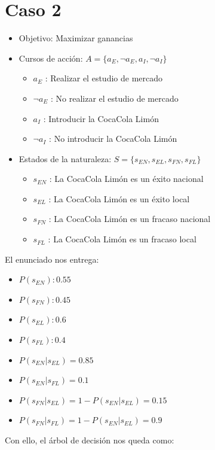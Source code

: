 \documentclass[11pt,letterpaper]{article}
\begin{document}
\section{Caso 2}
\begin{itemize}
    \item Objetivo: Maximizar ganancias
    \item Cursos de acción: $A=\{a_E, \neg a_E, a_I, \neg a_I\}$
        \begin{itemize}
            \item $a_E$ : Realizar el estudio de mercado
            \item $\neg a_E$ : No realizar el estudio de mercado
            \item $a_I$ : Introducir la CocaCola Limón
            \item $\neg a_I$ : No introducir la CocaCola Limón
        \end{itemize}
    \item Estados de la naturaleza: $S=\{s_{EN}, s_{EL}, s_{FN}, s_{FL}\}$
        \begin{itemize}
            \item $s_{EN}$ : La CocaCola Limón es un éxito nacional
            \item $s_{EL}$ : La CocaCola Limón es un éxito local
            \item $s_{FN}$ : La CocaCola Limón es un fracaso nacional
            \item $s_{FL}$ : La CocaCola Limón es un fracaso local
        \end{itemize}
\end{itemize}

El enunciado nos entrega:
\begin{itemize}
    \item $P(s_{EN}): 0.55$
    \item $P(s_{FN}): 0.45$
    \item $P(s_{EL}): 0.6$
    \item $P(s_{FL}): 0.4$
    \item $P(s_{EN}|s_{EL}) = 0.85$
    \item $P(s_{EN}|s_{FL}) = 0.1$
    \item $P(s_{FN}|s_{EL}) = 1 - P(s_{EN}|s_{EL}) = 0.15$
    \item $P(s_{FN}|s_{FL}) = 1 - P(s_{EN}|s_{EL}) = 0.9$
\end{itemize}

Con ello, el árbol de decisión nos queda como:

\end{document}
